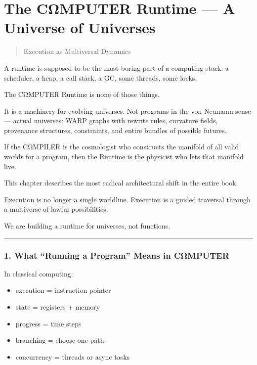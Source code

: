 \chapter{The CΩMPUTER Runtime --- A Universe of
Universes}\label{the-cux3c9mputer-runtime-a-universe-of-universes}

\begin{quote}
Execution as Multiversal Dynamics
\end{quote}

A runtime is supposed to be the most boring part of a computing stack: a
scheduler, a heap, a call stack, a GC, some threads, some locks.

The CΩMPUTER Runtime is none of those things.

It is a machinery for evolving universes. Not
programs-in-the-von-Neumann sense --- actual universes: WARP graphs with
rewrite rules, curvature fields, provenance structures, constraints, and
entire bundles of possible futures.

If the CΩMPILER is the cosmologist who constructs the manifold of all
valid worlds for a program, then the Runtime is the physicist who lets
that manifold live.

This chapter describes the most radical architectural shift in the
entire book:

Execution is no longer a single worldline. Execution is a guided
traversal through a multiverse of lawful possibilities.

We are building a runtime for universes, not functions.

\begin{center}\rule{0.5\linewidth}{0.5pt}\end{center}

\subsection{1. What ``Running a Program'' Means in
CΩMPUTER}\label{what-running-a-program-means-in-cux3c9mputer}

In classical computing:

\begin{itemize}
\tightlist
\item
  execution = instruction pointer
\item
  state = registers + memory
\item
  progress = time steps
\item
  branching = choose one path
\item
  concurrency = threads or async tasks
\end{itemize}

